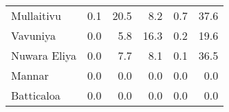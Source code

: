 \begin{tabular}{lrrrrr}
Mullaitivu   &         0.1 &        20.5 &          8.2 &              0.7 &        37.6 \\
Vavuniya     &         0.0 &         5.8 &         16.3 &              0.2 &        19.6 \\
Nuwara Eliya &         0.0 &         7.7 &          8.1 &              0.1 &        36.5 \\
Mannar       &         0.0 &         0.0 &          0.0 &              0.0 &         0.0 \\
Batticaloa   &         0.0 &         0.0 &          0.0 &              0.0 &         0.0 \\
\bottomrule
\end{tabular}
